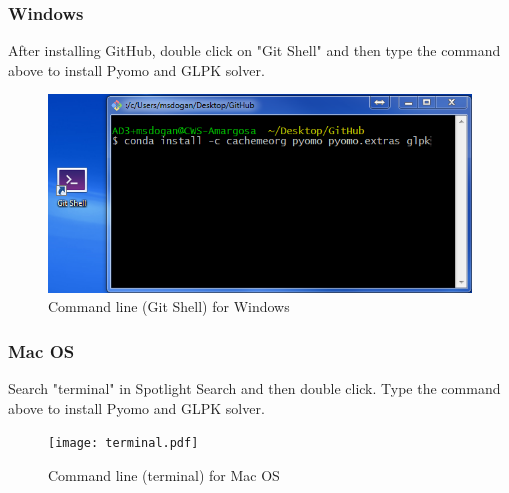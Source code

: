 \documentclass[12pt]{article}%
\begin{document}
\subsubsection{Windows}
%
After installing GitHub, double click on "Git Shell" and then type the command above to install Pyomo and GLPK solver.
%
\begin{figure}[H]
		\centering
    		\includegraphics[width=0.6\linewidth]{Capture.png}
   		\caption{Command line (Git Shell) for Windows}
    		\label{fig:gitshell}
\end{figure}
%
\subsubsection{Mac OS}
%
Search "terminal" in Spotlight Search and then double click. Type the command above to install Pyomo and GLPK solver.
\begin{figure}[H]
		\centering
    		\texttt{[image: terminal.pdf]}
   		\caption{Command line (terminal) for Mac OS}
    		\label{fig:terminal}
\end{figure}
%
\pagebreak
%
\end{document}

